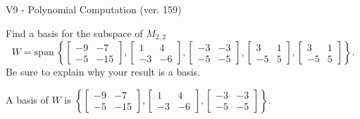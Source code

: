 \begin{exercise}
  \begin{exerciseTitle}V9 - Polynomial Computation (ver. 159)\end{exerciseTitle}
  \begin{exerciseStatement}
    Find a basis for the subspace of \(M_{2,2}\) 
\[W=\mathrm{span}\ \left\{\left[\begin{array}{cc}
-9 & -7 \\
-5 & -15
\end{array}\right] , \left[\begin{array}{cc}
1 & 4 \\
-3 & -6
\end{array}\right] , \left[\begin{array}{cc}
-3 & -3 \\
-5 & -5
\end{array}\right] , \left[\begin{array}{cc}
3 & 1 \\
-5 & 5
\end{array}\right] , \left[\begin{array}{cc}
3 & 1 \\
-5 & 5
\end{array}\right]\right\}.\]
 Be sure to explain why your result is a basis.


  \end{exerciseStatement}
  \begin{exerciseAnswer}
   A basis of \(W\) is  \(\left\{\left[\begin{array}{cc}
-9 & -7 \\
-5 & -15
\end{array}\right] , \left[\begin{array}{cc}
1 & 4 \\
-3 & -6
\end{array}\right] , \left[\begin{array}{cc}
-3 & -3 \\
-5 & -5
\end{array}\right]\right\}\).
  


  \end{exerciseAnswer}
\end{exercise}